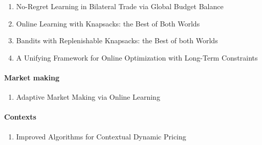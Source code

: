 \documentclass[a4paper,11pt]{article}
\begin{document}
\begin{enumerate}
    \item No-Regret Learning in Bilateral Trade via Global Budget Balance \citep{Bernasconi2023-ze}

    \item Online Learning with Knapsacks: the Best of Both Worlds
    \citep{Celli2022-te}

    \item Bandits with Replenishable Knapsacks: the Best of both Worlds
    \citep{Bernasconi2023-qm}

    \item A Unifying Framework for Online Optimization with Long-Term Constraints
    \citep{Castiglioni2022-ci}
\end{enumerate}

\paragraph{Market making}

\begin{enumerate}
    \item Adaptive Market Making via Online Learning
    \citep{NIPS2013_995e1fda}
\end{enumerate}

\paragraph{Contexts}

\begin{enumerate}
    \item Improved Algorithms for Contextual Dynamic Pricing
    \citep{Tullii2024-bn}
\end{enumerate}


\end{document}
